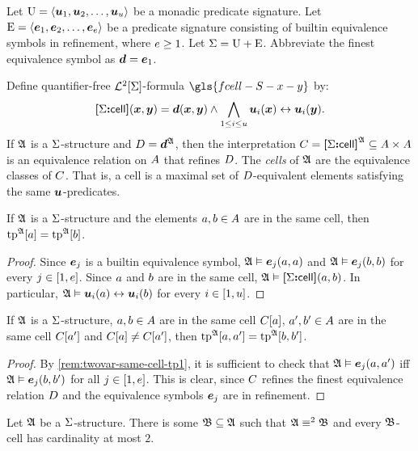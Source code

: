 
Let $\mathrm{U} = \left\langle \bm{u}_{1},\bm{u}_{2},\dots,\bm{u}_{u} \right\rangle$ be a monadic predicate signature.
Let $\mathrm{E} = \left\langle \bm{e}_{1},\bm{e}_{2},\dots,\bm{e}_{e} \right\rangle$ be a predicate signature consisting
of builtin equivalence symbols in refinement, where $e \geq 1$.
Let $\mathrm{\Sigma} = \mathrm{U} + \mathrm{E}$.
Abbreviate the finest equivalence symbol as $\bm{d} = \bm{e}_{1}$.
\begin{definition}
Define quantifier-free $\mathcal{L}^{2}[\mathrm{\Sigma}]$-formula $\gls{fcell-S-x-y}$ by:
\[
  {\bm{[}\mathrm{\Sigma}\mathord{\bm{:}}\mathsf{cell}\bm{]}}(\bm{x},\bm{y}) = \bm{d}(\bm{x},\bm{y}) \land
  \bigwedge_{1 \leq i \leq u} \bm{u}_{i}(\bm{x}) \leftrightarrow \bm{u}_{i}(\bm{y}).
\]
If $\mathfrak{A}$ is a $\mathrm{\Sigma}$-structure and $D = \bm{d}^{\mathfrak{A}}$, then the
interpretation $C = {\bm{[}\mathrm{\Sigma}\mathord{\bm{:}}\mathsf{cell}\bm{]}}^{\mathfrak{A}} \subseteq {A\times A}$ is an
equivalence relation on $A$ that refines $D$.
The \emph{cells} of $\mathfrak{A}$ are the equivalence classes of $C$.
That is, a cell is a maximal set of $D$-equivalent elements satisfying the
same $\bm{u}$-predicates.
\end{definition}

\begin{remark}\label{rem:twovar-same-cell-tp1}
If $\mathfrak{A}$ is a $\mathrm{\Sigma}$-structure and the elements $a, b \in A$ are in
the same cell, then $\operatorname{tp}^{\mathfrak{A}}[a] = \operatorname{tp}^{\mathfrak{A}}[b]$.
\end{remark}
\begin{proof}
Since $\bm{e}_{j}$ is a builtin equivalence symbol,
$\mathfrak{A} \vDash \bm{e}_{j}(a,a)$ and $\mathfrak{A} \vDash \bm{e}_{j}(b,b)$
for every $j \in [1,e]$.
Since $a$ and $b$ are in the same cell,
$\mathfrak{A} \vDash {\bm{[}\mathrm{\Sigma}\mathord{\bm{:}}\mathsf{cell}\bm{]}}(a,b)$.
In particular, $\mathfrak{A} \vDash \bm{u}_{i}(a) \leftrightarrow \bm{u}_{i}(b)$ for every
$i \in [1,u]$.
\end{proof}
\begin{remark}\label{rem:twovar-same-cell-tp2}
If $\mathfrak{A}$ is a $\mathrm{\Sigma}$-structure, $a, b \in A$ are in the same cell
$C[a]$, ${a'}, {b'} \in A$ are in the same cell $C[{a'}]$ and
$C[a] \neq C[{a'}]$,
then $\operatorname{tp}^{\mathfrak{A}}[a,{a'}] = \operatorname{tp}^{\mathfrak{A}}[b,{b'}]$.
\end{remark}
\begin{proof}
By \cref{rem:twovar-same-cell-tp1}, it is sufficient to check that
$\mathfrak{A} \vDash \bm{e}_{j}(a, {a'})$ iff $\mathfrak{A} \vDash \bm{e}_{j}(b, {b'})$
for all $j \in [1,e]$.
This is clear, since $C$ refines the finest equivalence relation $D$ and
the equivalence symbols $\bm{e}_{j}$ are in refinement.
\end{proof}

\begin{lemma}\label{lem:twovar-cell-2}
Let $\mathfrak{A}$ be a $\mathrm{\Sigma}$-structure.
There is some $\mathfrak{B} \subseteq \mathfrak{A}$ such that
$\mathfrak{A} \equiv^{2} \mathfrak{B}$ and every
$\mathfrak{B}$-cell has cardinality at most $2$.
\end{lemma}

